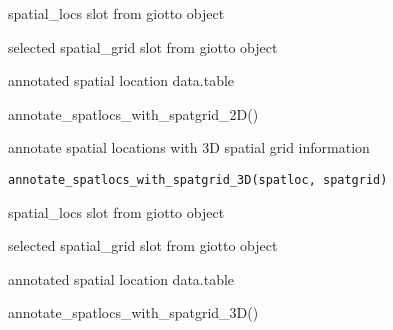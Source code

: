\documentclass[a4paper]{book}
\begin{document}
%
\begin{Arguments}
\begin{ldescription}
\item[\code{spatloc}] spatial\_locs slot from giotto object

\item[\code{spatgrid}] selected spatial\_grid slot from giotto object
\end{ldescription}
\end{Arguments}
%
\begin{Value}
annotated spatial location data.table
\end{Value}
%
\begin{Examples}
\begin{ExampleCode}
    annotate_spatlocs_with_spatgrid_2D()
\end{ExampleCode}
\end{Examples}
%
\begin{Description}\relax
annotate spatial locations with 3D spatial grid information
\end{Description}
%
\begin{Usage}
\begin{verbatim}
annotate_spatlocs_with_spatgrid_3D(spatloc, spatgrid)
\end{verbatim}
\end{Usage}
%
\begin{Arguments}
\begin{ldescription}
\item[\code{spatloc}] spatial\_locs slot from giotto object

\item[\code{spatgrid}] selected spatial\_grid slot from giotto object
\end{ldescription}
\end{Arguments}
%
\begin{Value}
annotated spatial location data.table
\end{Value}
%
\begin{Examples}
\begin{ExampleCode}
    annotate_spatlocs_with_spatgrid_3D()
\end{ExampleCode}
\end{Examples}
\end{document}
